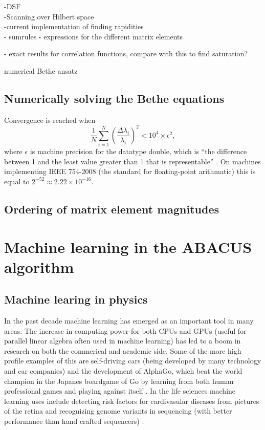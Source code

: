 \documentclass[11pt, a4paper]{report} %
\begin{document}
-DSF\cite{Cherny2008}\\
-Scanning over Hilbert space\\
-current implementation of finding rapidities\\
- sumrules
- expressions for the different matrix elements

- exact results for correlation functions\cite{Lang2017}, compare with this to find saturation?

numerical Bethe ansatz \cite{Gu2005}
\section{Numerically solving the Bethe equations}

Convergence is reached when \cite{Caux2009}
\begin{equation}
	\frac{1}{N}\sum_{i=1}^{N} \left(\frac{\Delta \lambda_i}{\lambda_i}\right)^2 < 10^4 \times \epsilon^2,
\end{equation}
where \(\epsilon\) is machine precision for the datatype double, which is ``the difference between 1 and the least value greater than 1 that is representable'' \cite{cppstandard2016}.
On machines implementing IEEE 754-2008 (the standard for floating-point arithmatic) \cite{ieeefp2008} this is equal to \({2^{-52} \approx 2.22 \times 10^{-16}}\).

\section{Ordering of matrix element magnitudes}




\chapter{Machine learning in the ABACUS algorithm}\label{chap:machine_learning}

\section{Machine learing in physics}

In the past decade machine learning has emerged as an important tool in many areas.
The increase in computing power for both CPUs and GPUs (useful for parallel linear algebra often used in machine learning) has led to a boom in research on both the commerical and academic side.
Some of the more high profile examples of this are self-driving cars (being developed by many technology and car companies)  and the development of AlphaGo, which beat the world champion in the Japanes boardgame of Go by learning from both human professional games and playing against itself \cite{Silver2017a,Silver2017}.
In the life sciences machine learning uses include detecting risk factors for cardivasular diseases from pictures of the retina \cite{poplin17_predic_cardiov_risk_factor_from} and recognizing genome variants in sequencing (with better performance than hand crafted sequencers) \cite{Poplin2016}.
\end{document}
